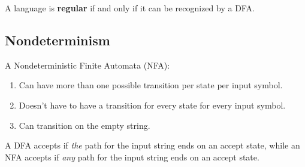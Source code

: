 \documentclass{article}
\begin{document}
A language is \textbf{regular} if and only if it can be recognized by a DFA.

\subsection*{Nondeterminism}

A Nondeterministic Finite Automata (NFA):
\begin{enumerate}
    \item Can have more than one possible transition per state per input symbol.
    \item Doesn't have to have a transition for every state for every input symbol.
    \item Can transition on the empty string.
\end{enumerate}

A DFA accepts if \textit{the} path for the input string ends on an accept state, while an NFA accepts if \textit{any} path for the input string ends on an accept state.
\end{document}
